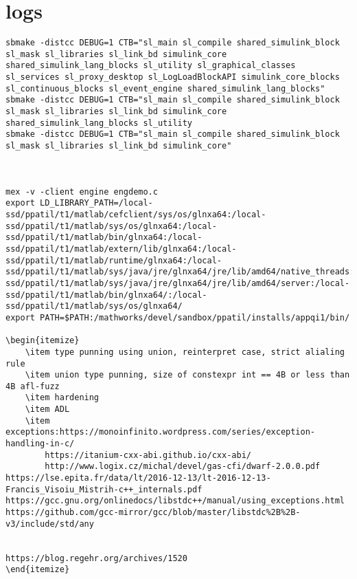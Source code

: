 \section{logs} 
\begin{verbatim}
sbmake -distcc DEBUG=1 CTB="sl_main sl_compile shared_simulink_block sl_mask sl_libraries sl_link_bd simulink_core shared_simulink_lang_blocks sl_utility sl_graphical_classes sl_services sl_proxy_desktop sl_LogLoadBlockAPI simulink_core_blocks sl_continuous_blocks sl_event_engine shared_simulink_lang_blocks"
sbmake -distcc DEBUG=1 CTB="sl_main sl_compile shared_simulink_block sl_mask sl_libraries sl_link_bd simulink_core shared_simulink_lang_blocks sl_utility
sbmake -distcc DEBUG=1 CTB="sl_main sl_compile shared_simulink_block sl_mask sl_libraries sl_link_bd simulink_core"



mex -v -client engine engdemo.c
export LD_LIBRARY_PATH=/local-ssd/ppatil/t1/matlab/cefclient/sys/os/glnxa64:/local-ssd/ppatil/t1/matlab/sys/os/glnxa64:/local-ssd/ppatil/t1/matlab/bin/glnxa64:/local-ssd/ppatil/t1/matlab/extern/lib/glnxa64:/local-ssd/ppatil/t1/matlab/runtime/glnxa64:/local-ssd/ppatil/t1/matlab/sys/java/jre/glnxa64/jre/lib/amd64/native_threads:/local-ssd/ppatil/t1/matlab/sys/java/jre/glnxa64/jre/lib/amd64/server:/local-ssd/ppatil/t1/matlab/bin/glnxa64/:/local-ssd/ppatil/t1/matlab/sys/os/glnxa64/
export PATH=$PATH:/mathworks/devel/sandbox/ppatil/installs/appqi1/bin/

\begin{itemize}
    \item type punning using union, reinterpret case, strict alialing rule
    \item union type punning, size of constexpr int == 4B or less than 4B afl-fuzz
    \item hardening
    \item ADL
    \item exceptions:https://monoinfinito.wordpress.com/series/exception-handling-in-c/  
        https://itanium-cxx-abi.github.io/cxx-abi/ 
        http://www.logix.cz/michal/devel/gas-cfi/dwarf-2.0.0.pdf
https://lse.epita.fr/data/lt/2016-12-13/lt-2016-12-13-Francis_Visoiu_Mistrih-c++_internals.pdf
https://gcc.gnu.org/onlinedocs/libstdc++/manual/using_exceptions.html
https://github.com/gcc-mirror/gcc/blob/master/libstdc%2B%2B-v3/include/std/any


https://blog.regehr.org/archives/1520
\end{itemize}
\end{verbatim}

